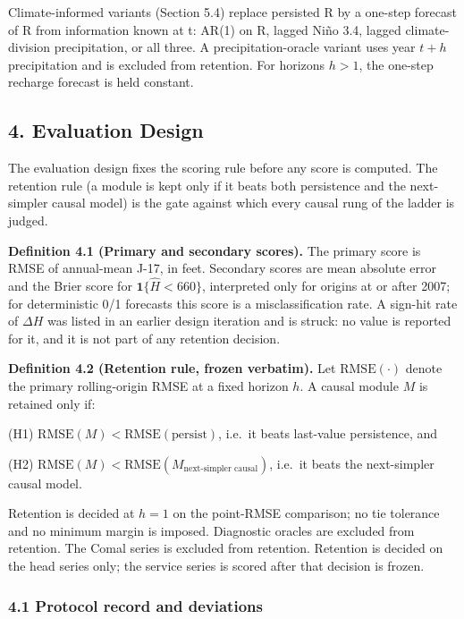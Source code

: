 \documentclass[11pt]{article}
\begin{document}
Climate-informed variants (Section 5.4) replace persisted R by a
one-step forecast of R from information known at t: AR(1) on R, lagged
Ni\~no 3.4, lagged climate-division precipitation, or all three. A
precipitation-oracle variant uses year \(t+h\) precipitation and is
excluded from retention. For horizons \(h>1\), the one-step recharge
forecast is held constant.

\subsection{4. Evaluation Design}\label{edw-evaluation-design}

The evaluation design fixes the scoring rule before any score is
computed. The retention rule (a module is kept only if it beats both
persistence and the next-simpler causal model) is the gate against which
every causal rung of the ladder is judged.

\textbf{Definition 4.1 (Primary and secondary scores).} The primary
score is RMSE of annual-mean J-17, in feet. Secondary scores are mean
absolute error and the Brier score for \(\mathbf{1}\{\hat H < 660\}\),
interpreted only for origins at or after 2007; for deterministic 0/1
forecasts this score is a misclassification rate. A sign-hit rate of
\(\Delta H\) was listed in an earlier design iteration and is struck: no
value is reported for it, and it is not part of any retention decision.

\textbf{Definition 4.2 (Retention rule, frozen verbatim).} Let
\(\mathrm{RMSE}(\cdot)\) denote the primary rolling-origin RMSE at a
fixed horizon \(h\). A causal module \(M\) is retained only if:

(H1) \(\mathrm{RMSE}(M) < \mathrm{RMSE}(\text{persist})\), i.e.~it beats
last-value persistence, and

(H2)
\(\mathrm{RMSE}(M) < \mathrm{RMSE}(M_{\text{next-simpler causal}})\),
i.e.~it beats the next-simpler causal model.

Retention is decided at \(h=1\) on the point-RMSE comparison; no tie
tolerance and no minimum margin is imposed. Diagnostic oracles are
excluded from retention. The Comal series is excluded from retention.
Retention is decided on the head series only; the service series is
scored after that decision is frozen.

\subsubsection{4.1 Protocol record and
deviations}\label{edw-protocol-record-and-deviations}
\end{document}
